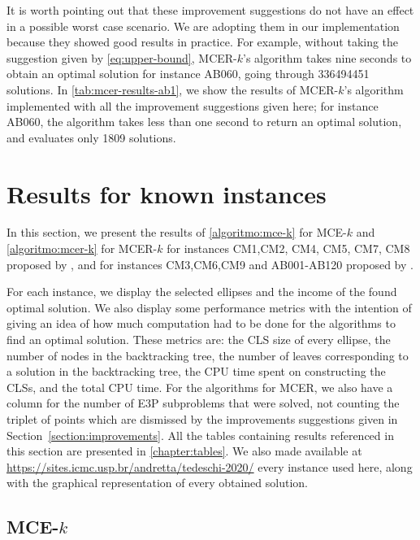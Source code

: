 It is worth pointing out that these improvement suggestions do not have an effect in a possible worst case scenario. We are adopting them in our implementation because they showed good results in practice.
For example, without taking the suggestion given by \autoref{eq:upper-bound}, 
MCER-$k$'s algorithm takes nine seconds to obtain an optimal solution for instance AB060, going through \num{336494451} solutions.
In \autoref{tab:mcer-results-ab1}, we show the results of MCER-$k$'s algorithm implemented with all the improvement suggestions given here; for instance AB060, the algorithm takes less than one second to return an optimal solution, and evaluates only \num{1809} solutions.

\section{Results for known instances}

In this section, we present the results of \autoref{algoritmo:mce-k} for MCE-$k$ and \autoref{algoritmo:mcer-k} for MCER-$k$ for instances CM1,CM2, CM4, CM5, CM7, CM8 proposed by , and for instances CM3,CM6,CM9 and AB001-AB120 proposed by . 

For each instance, we display the selected ellipses and the income of the found optimal solution. 
We also display some performance metrics with the intention of giving an idea of how much computation had to be done for the algorithms to find an optimal solution. These metrics are: 
the CLS size of every ellipse, the number of nodes in the backtracking tree, the number of leaves corresponding to a solution in the backtracking tree, the CPU time spent on constructing the CLSs, and the total CPU time.
For the algorithms for MCER, we also have a column for the number of E3P subproblems that were solved, not counting the triplet of points which are dismissed by the improvements suggestions given in Section~\ref{section:improvements}. All the tables containing results referenced in this section are presented in \autoref{chapter:tables}. 
We also made available at \url{https://sites.icmc.usp.br/andretta/tedeschi-2020/} every instance used here, along with the graphical representation of every obtained solution.


\subsection{MCE-$k$}

